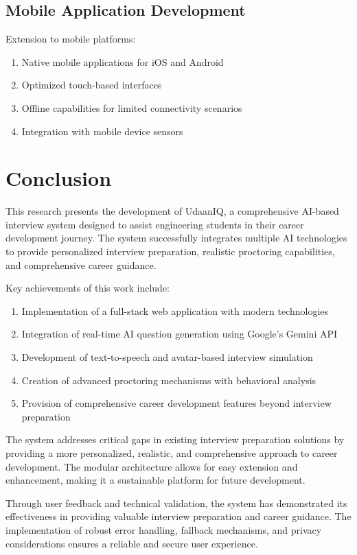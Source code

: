 \documentclass[12pt, conference]{IEEEtran}
\begin{document}
\subsection{Mobile Application Development}

Extension to mobile platforms:
\begin{enumerate}
    \item Native mobile applications for iOS and Android
    \item Optimized touch-based interfaces
    \item Offline capabilities for limited connectivity scenarios
    \item Integration with mobile device sensors
\end{enumerate}

\section{Conclusion}

This research presents the development of UdaanIQ, a comprehensive AI-based interview system designed to assist engineering students in their career development journey. The system successfully integrates multiple AI technologies to provide personalized interview preparation, realistic proctoring capabilities, and comprehensive career guidance.

Key achievements of this work include:
\begin{enumerate}
    \item Implementation of a full-stack web application with modern technologies
    \item Integration of real-time AI question generation using Google's Gemini API
    \item Development of text-to-speech and avatar-based interview simulation
    \item Creation of advanced proctoring mechanisms with behavioral analysis
    \item Provision of comprehensive career development features beyond interview preparation
\end{enumerate}

The system addresses critical gaps in existing interview preparation solutions by providing a more personalized, realistic, and comprehensive approach to career development. The modular architecture allows for easy extension and enhancement, making it a sustainable platform for future development.

Through user feedback and technical validation, the system has demonstrated its effectiveness in providing valuable interview preparation and career guidance. The implementation of robust error handling, fallback mechanisms, and privacy considerations ensures a reliable and secure user experience.
\end{document}
